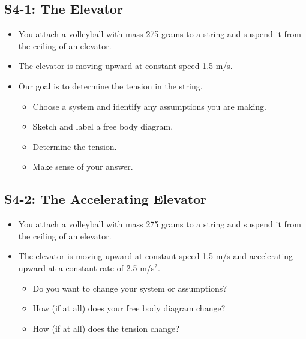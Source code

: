 \documentclass[]{article}
\begin{document}
\begin{PresentSpace}
\vspace{-10pt}
\section*{S4-1: The Elevator}
\vspace{-10pt}
\begin{itemize}
	\item You attach a volleyball with mass 275 grams to a string and suspend it from the ceiling of an elevator.
	\item The elevator is moving upward at constant speed 1.5 m/s.
	\item Our goal is to determine the tension in the string.
	\begin{itemize}
		\item Choose a system and identify any assumptions you are making.
		\item Sketch and label a free body diagram.
		\item Determine the tension.
		\item Make sense of your answer.
	\end{itemize}
\end{itemize}
\end{PresentSpace}
\newpage
\begin{TeacherMargin}

\end{TeacherMargin}
\begin{PresentSpace}
\vspace{-10pt}
\section*{S4-2: The Accelerating Elevator}
\vspace{-10pt}
\begin{itemize}
	\item You attach a volleyball with mass 275 grams to a string and suspend it from the ceiling of an elevator.
	\item The elevator is moving upward at constant speed 1.5 m/s and accelerating upward at a constant rate of 2.5 m/s$^{2}$.
	\begin{itemize}
		\item Do you want to change your system or assumptions?
		\item How (if at all) does your free body diagram change?
		\item How (if at all) does the tension change?
	\end{itemize}
\end{itemize}
\end{PresentSpace}
\end{document}
